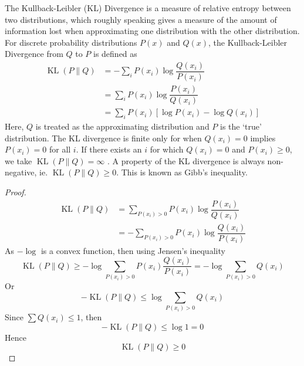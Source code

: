 \documentclass[11pt]{report} %
\begin{document}
The Kullback-Leibler (KL) Divergence is a measure of relative entropy between two distributions, which roughly speaking gives a measure of the amount of information lost when approximating one distribution with the other distribution. For discrete probability distributions $P\left(x\right)$ and $Q\left(x\right)$, the Kullback-Leibler Divergence from $Q$ to $P$ is defined as
\begin{align}
\operatorname{KL}\left(P\|Q\right) &= -\sum_{i}P\left(x_{i}\right)\log\dfrac{Q\left(x_{i}\right)}{P\left(x_{i}\right)} \\
&= \sum_{i}P\left(x_{i}\right)\log\dfrac{P\left(x_{i}\right)}{Q\left(x_{i}\right)} \\
&= \sum_{i}P\left(x_{i}\right)\left[\log P\left(x_{i}\right) - \log Q\left(x_{i}\right)\right]
\end{align}
Here, $Q$ is treated as the approximating distribution and $P$ is the `true' distribution. The KL divergence is finite only for when $Q\left(x_{i}\right) = 0$ implies $P\left(x_{i}\right) = 0$ for all $i$. If there exists an $i$ for which $Q\left(x_{i}\right) = 0$ and $P\left(x_{i}\right) \geq 0$, we take $\operatorname{KL}\left(P\|Q\right) = \infty$ \cite{Cover2006}. A property of the KL divergence is always non-negative, ie. $\operatorname{KL}\left(P\|Q\right) \geq 0$. This is known as Gibb's inequality.
\begin{proof}
\begin{align}
\operatorname{KL}\left(P\|Q\right) &= \sum_{P\left(x_{i}\right) > 0}P\left(x_{i}\right)\log\dfrac{P\left(x_{i}\right)}{Q\left(x_{i}\right)} \\
&= -\sum_{P\left(x_{i}\right) > 0}P\left(x_{i}\right)\log\dfrac{Q\left(x_{i}\right)}{P\left(x_{i}\right)}
\end{align}
As $-\log$ is a convex function, then using Jensen's inequality
\begin{equation}
\operatorname{KL}\left(P\|Q\right) \geq -\log\sum_{P\left(x_{i}\right) > 0}P\left(x_{i}\right)\dfrac{Q\left(x_{i}\right)}{P\left(x_{i}\right)} = -\log\sum_{P\left(x_{i}\right) > 0}Q\left(x_{i}\right)
\end{equation}
Or
\begin{equation}
-\operatorname{KL}\left(P\|Q\right) \leq \log\sum_{P\left(x_{i}\right) > 0}Q\left(x_{i}\right)
\end{equation}
Since $\sum Q\left(x_{i}\right) \leq 1$, then
\begin{equation}
-\operatorname{KL}\left(P\|Q\right) \leq \log 1 = 0
\end{equation}
Hence
\begin{equation}
\operatorname{KL}\left(P\|Q\right) \geq 0
\end{equation}
\end{proof}
\end{document}
